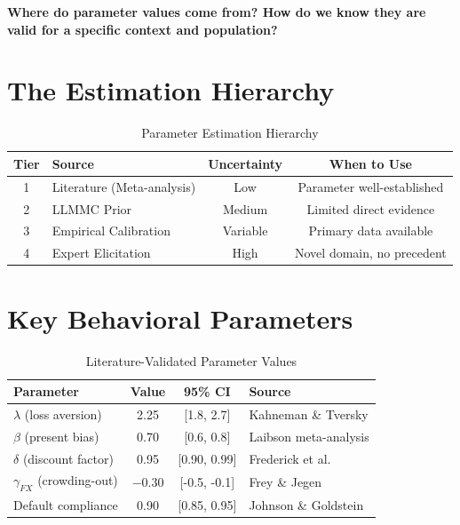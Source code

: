 \begin{tcolorbox}[colback=red!5!white, colframe=red!75!black,
    title=The Fundamental Question]
\textbf{Where do parameter values come from? How do we know they are valid
for a specific context and population?}
\end{tcolorbox}

\section{The Estimation Hierarchy}
\label{sec:where-hierarchy}

\begin{table}[htbp]
\centering
\caption{Parameter Estimation Hierarchy}
\label{tab:where-hierarchy}
\renewcommand{\arraystretch}{1.3}
\begin{tabular}{@{}clcc@{}}
\toprule
\textbf{Tier} & \textbf{Source} & \textbf{Uncertainty} & \textbf{When to Use} \\
\midrule
1 & Literature (Meta-analysis) & Low & Parameter well-established \\
2 & LLMMC Prior & Medium & Limited direct evidence \\
3 & Empirical Calibration & Variable & Primary data available \\
4 & Expert Elicitation & High & Novel domain, no precedent \\
\bottomrule
\end{tabular}
\end{table}

\section{Key Behavioral Parameters}
\label{sec:where-parameters}

\begin{table}[htbp]
\centering
\caption{Literature-Validated Parameter Values}
\label{tab:where-values}
\renewcommand{\arraystretch}{1.3}
\begin{tabular}{@{}lccl@{}}
\toprule
\textbf{Parameter} & \textbf{Value} & \textbf{95\% CI} & \textbf{Source} \\
\midrule
$\lambda$ (loss aversion) & 2.25 & [1.8, 2.7] & Kahneman \& Tversky \\
$\beta$ (present bias) & 0.70 & [0.6, 0.8] & Laibson meta-analysis \\
$\delta$ (discount factor) & 0.95 & [0.90, 0.99] & Frederick et al. \\
$\gamma_{FX}$ (crowding-out) & $-0.30$ & [-0.5, -0.1] & Frey \& Jegen \\
Default compliance & 0.90 & [0.85, 0.95] & Johnson \& Goldstein \\
\bottomrule
\end{tabular}
\end{table}

